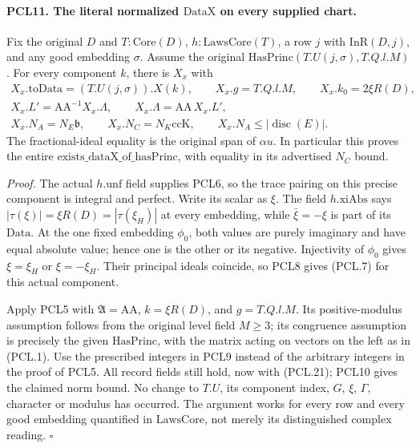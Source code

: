 \paragraph{PCL11. The literal normalized \(\mathrm{DataX}\) on every supplied chart.}
\label{claim:PCL11}
Fix the original \(D\) and \(T:\mathrm{Core}(D)\),
\(h:\mathrm{LawsCore}(T)\), a row \(j\) with
\(\mathrm{InR}(D,j)\), and any good embedding \(\sigma\).
Assume the original
\(\mathrm{HasPrinc}(T.U(j,\sigma),T.Q.l.M)\).
For every component \(k\), there is \(X_x\) with
\[
 \begin{gathered}
 X_x.\mathrm{toData}=(T.U(j,\sigma)).X(k),\qquad
 X_x.g=T.Q.l.M,\qquad X_x.k_0=2\xi R(D),\\
 X_x.L'=\mathrm{AA}^{-1}X_x.\Lambda,\qquad
 X_x.\Lambda=\mathrm{AA}\,X_x.L',\\
 X_x.N_A=N_E\mathfrak b,\qquad
 X_x.N_C=N_K\mathrm{ccK},\qquad
 X_x.N_A\le|\operatorname{disc}(E)|.
 \end{gathered}                                                   \tag{PCL.21}
\]
The fractional-ideal equality is the original span of
\(\alpha u\).  In particular this proves the entire
\(\mathrm{exists\_dataX\_of\_hasPrinc}\), with equality
in its advertised \(N_C\) bound.

\emph{Proof.}
The actual \(h.\mathrm{unf}\) field supplies PCL6, so
the trace pairing on this precise component is integral
and perfect.  Write its scalar as \(\xi\).
The field \(h.\mathrm{xiAbs}\) says
\(|\tau(\xi)|=\xi R(D)=|\tau(\xi_H)|\) at every
embedding, while \(\bar\xi=-\xi\) is part of its
\(\mathrm{Data}\).  At the one fixed embedding \(\phi_0\),
both values are purely imaginary and have equal absolute
value; hence one is the other or its negative.
Injectivity of \(\phi_0\) gives \(\xi=\xi_H\) or
\(\xi=-\xi_H\).  Their principal ideals coincide,
so PCL8 gives (PCL.7) for this actual component.

Apply PCL5 with \(\mathfrak A=\mathrm{AA}\),
\(k=\xi R(D)\), and \(g=T.Q.l.M\).
Its positive-modulus assumption follows from the
original level field \(M\ge3\); its congruence assumption
is precisely the given \(\mathrm{HasPrinc}\), with the
matrix acting on vectors on the left as in (PCL.1).
Use the prescribed integers in PCL9 instead of the
arbitrary integers in the proof of PCL5.  All record
fields still hold, now with (PCL.21); PCL10 gives the
claimed norm bound.  No change to \(T.U\), its component
index, \(G\), \(\xi\), \(\Gamma\), character or modulus
has occurred.  The argument works for every row and
every good embedding quantified in \(\mathrm{LawsCore}\),
not merely its distinguished complex reading.
\hfill\(\square\)


